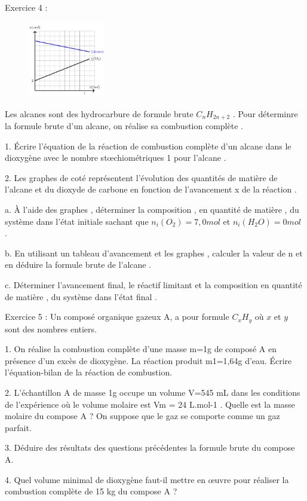 \documentclass[12pt, french]{article}
\begin{document}
\begin{Box2}{Exercice 4 : }
  \begin{figure}
  \begin{center}
    \includegraphics[width=0.3\textwidth]{./img/img01.png}
  \end{center}
\end{figure}


Les alcanes sont des hydrocarbure de formule brute $C_nH_{2n+2}$ . Pour déterminre la formule brute d’un alcane, on réalise sa combustion complète .

1. Écrire l’équation de la réaction de combustion complète d’un alcane dans le dioxygène avec le nombre stœchiométriques 1 pour l’alcane .

2. Les graphes de coté représentent l’évolution des quantités de matière de l’alcane et du dioxyde de carbone en fonction de l’avancement x de la réaction .

a. À l’aide des graphes , déterminer la composition , en quantité de matière , du système dans l’état initiale sachant que $n_i(O_2) = 7, 0 mol$ et $n_i(H_2O) = 0 mol$ .

b. En utilisant un tableau d’avancement et les graphes , calculer la valeur de n et en déduire la formule brute de l’alcane . 

c. Déterminer l’avancement final, le réactif limitant et la composition en quantité de matière , du système dans l’état final .
\end{Box2}


\begin{Box2}{Exercice 5 : }
Un composé organique gazeux A, a pour formule $ C_xH_y$ où $x$ et $y$ sont des nombres entiers.

   1. On réalise la combustion complète d’une masse m=1g de composé A en présence d’un excès de dioxygène. La réaction produit m1=1,64g d’eau. Écrire l’équation-bilan de la réaction de combustion.

   2. L’échantillon A de masse 1g occupe un volume V=545 mL dans les conditions de l’expérience où le volume molaire est Vm = 24 L.mol-1 . Quelle est la masse molaire du compose A ? On suppose que le gaz se comporte comme un gaz parfait.

   3. Déduire des résultats des questions précédentes la formule brute du compose A.

   4. Quel volume minimal de dioxygène faut-il mettre en œuvre pour réaliser la combustion complète de 15 kg du compose A ?
\end{Box2}
\end{document}
